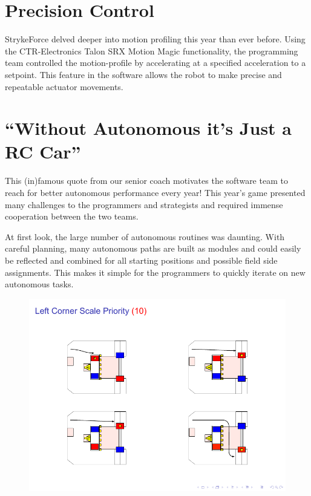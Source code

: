\documentclass[10pt,tumble]{leaflet}
\begin{document}
\section{Precision Control}

StrykeForce delved deeper into motion profiling this year than ever before.  Using the CTR-Electronics Talon SRX Motion Magic functionality, the programming team controlled the motion-profile by accelerating at a specified acceleration to a setpoint.  This feature in the software allows the robot to make precise and repeatable actuator movements.

\section{``Without Autonomous it's Just a RC Car''}

This (in)famous quote from our senior coach motivates the software team to reach for better autonomous performance every year! This year’s game presented many challenges to the programmers and strategists and required immense cooperation between the two teams.

At first look, the large number of autonomous routines was daunting.  With careful planning, many autonomous paths are built as modules and could easily be reflected and combined for all starting positions and possible field side assignments.  This makes it simple for the programmers to quickly iterate on new autonomous tasks.

\begin{figure}[H]
 \centering
 \includegraphics[scale=0.6]{assets/autons}
\end{figure}
\end{document}
